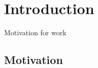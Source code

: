 \chapter{Introduction}\label{cha:introduction}

Motivation for work

\section{Motivation}\label{sec:motivation}